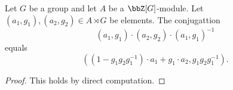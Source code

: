 \begin{lemma} \label{lemma:conjugation_in_semidirect_product_of_an_abelian_group_by_a_group}
    Let $G$ be a group and let $A$ be a $\bbZ[G]$-module. Let $(a_1, g_1), (a_2,g_2) \in A \rtimes G$ be elements.
    The conjugattion
    $$(a_1, g_1) \cdot (a_2,g_2) \cdot (a_1,g_1)^{-1}$$
    equals
    $$((1-g_1g_2g_1^{-1}) \cdot a_1 + g_1 \cdot a_2, g_1g_2g_1^{-1}).$$
\end{lemma}
\begin{proof}
    This holds by direct computation.
\end{proof}